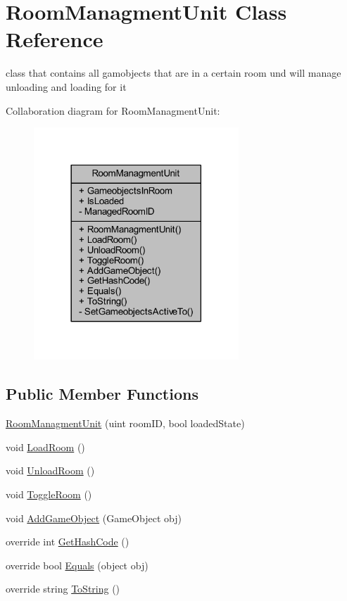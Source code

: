 \hypertarget{class_room_managment_unit}{}\section{Room\+Managment\+Unit Class Reference}
\label{class_room_managment_unit}


class that contains all gamobjects that are in a certain room und will manage unloading and loading for it  




Collaboration diagram for Room\+Managment\+Unit\+:\nopagebreak
\begin{figure}[H]
\begin{center}
\leavevmode
\includegraphics[width=218pt]{class_room_managment_unit__coll__graph}
\end{center}
\end{figure}
\subsection*{Public Member Functions}
\begin{DoxyCompactItemize}
\item 
\mbox{\hyperlink{class_room_managment_unit_ad9c4cf6c496f32f6e0edbe47a4bf0295}{Room\+Managment\+Unit}} (uint room\+ID, bool loaded\+State)
\item 
void \mbox{\hyperlink{class_room_managment_unit_a7f34dfb62166ebcbd2a314f0bcdb61e9}{Load\+Room}} ()
\item 
void \mbox{\hyperlink{class_room_managment_unit_a45c039de8a79db7ada5831e0abeda972}{Unload\+Room}} ()
\item 
void \mbox{\hyperlink{class_room_managment_unit_a6043074719f8d67150cbfcff4c7a4cec}{Toggle\+Room}} ()
\item 
void \mbox{\hyperlink{class_room_managment_unit_ac7f3f62eb0e6f9f0bb239266796a323a}{Add\+Game\+Object}} (Game\+Object obj)
\item 
override int \mbox{\hyperlink{class_room_managment_unit_ad76ae60e41c36a71934ff9cccca60039}{Get\+Hash\+Code}} ()
\item 
override bool \mbox{\hyperlink{class_room_managment_unit_a663946fa33bad407b32d75aea8e7d5d9}{Equals}} (object obj)
\item 
override string \mbox{\hyperlink{class_room_managment_unit_af1299b6fbb2496cc4cb0e14a95cc2b9c}{To\+String}} ()
\end{DoxyCompactItemize}
